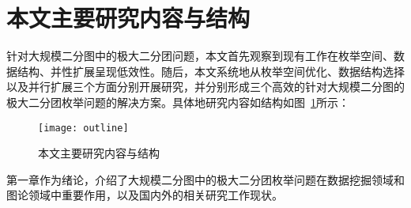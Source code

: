 

\section{本文主要研究内容与结构}

针对大规模二分图中的极大二分团问题，本文首先观察到现有工作在枚举空间、数据结构、并性扩展呈现低效性。随后，本文系统地从枚举空间优化、数据结构选择以及并行扩展三个方面分别开展研究，并分别形成三个高效的针对大规模二分图的极大二分团枚举问题的解决方案。具体地研究内容如结构如图~\ref{fig:outline}所示：

\begin{figure} [ht]
  \vspace{0.2 in}
  \centering
  \texttt{[image: outline]}
  \vspace{0.15 in}
  \caption{本文主要研究内容与结构}
  \label{fig:outline}
\end{figure}

第一章作为绪论，介绍了大规模二分图中的极大二分团枚举问题在数据挖掘领域和图论领域中重要作用，以及国内外的相关研究工作现状。

